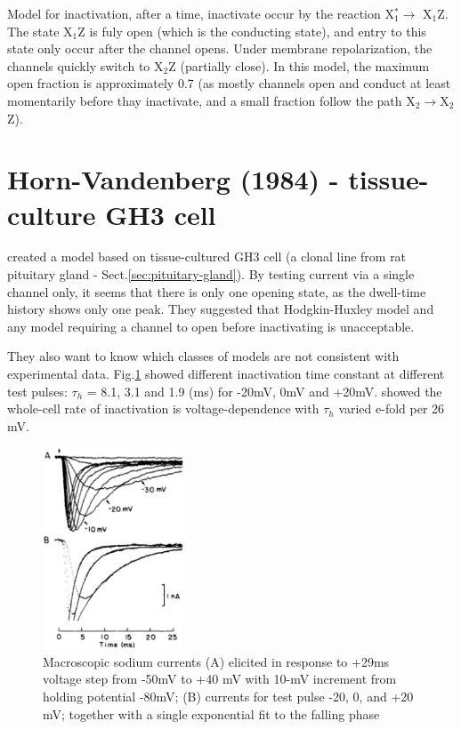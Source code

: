 Model for inactivation, after a time, inactivate occur by the reaction
X$_1^{*}\rightarrow$ X$_1$Z. The state X$_1$Z is fuly open (which is the
conducting state), and entry to this state only occur after the channel opens.
Under membrane repolarization, the channels quickly switch to X$_2$Z (partially
close). In this model, the maximum open fraction is approximately 0.7 (as
mostly channels open and conduct at least momentarily before thay inactivate,
and a small fraction follow the path X$_2\rightarrow$X$_2$Z).


\section{Horn-Vandenberg (1984) - tissue-culture GH3 cell}
\label{sec:Ina_Horn1984}

\citep{Horn1984} created a model based on tissue-cultured GH3 cell (a clonal
line from rat pituitary gland - Sect.\ref{sec:pituitary-gland}). 
By testing current via a single channel only, it seems that there is only one 
opening state, as the dwell-time history shows only one peak. 
They suggested that Hodgkin-Huxley model and any model requiring a channel
to open before inactivating is unacceptable.


They also want to know which classes of models are not consistent with
experimental data.
Fig.\ref{fig:Ina_Vandenberg} showed different inactivation time constant at
different test pulses: $\tau_h$ = 8.1, 3.1 and 1.9 (ms) for -20mV, 0mV and
+20mV. \citep{Vandenberg1984} showed the whole-cell rate of inactivation is
voltage-dependence with $\tau_h$ varied e-fold per 26 mV.


\begin{figure}[hbt]
 \centerline{\includegraphics[height=6cm,
 angle=0]{./images/Ina_Vandenberg1984.eps}}
\caption{Macroscopic sodium currents (A) elicited in response to +29ms voltage
step from -50mV to +40 mV with 10-mV increment from holding potential -80mV;
(B) currents for test pulse -20, 0, and +20 mV; together with a single
exponential fit to the falling phase \citep{Vandenberg1984}}
\label{fig:Ina_Vandenberg}
\end{figure}


